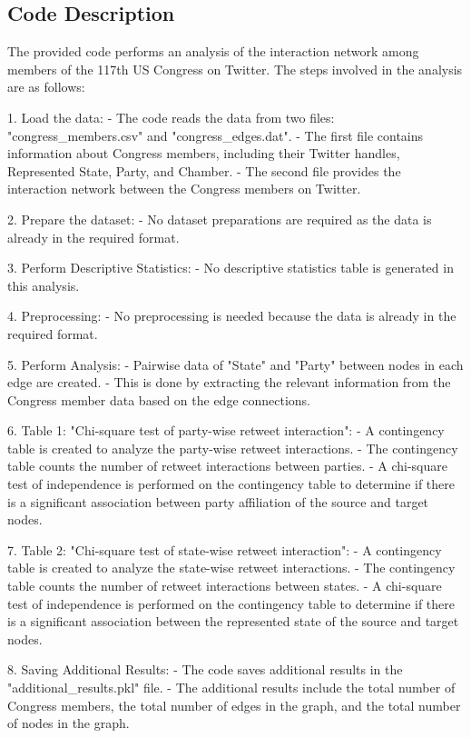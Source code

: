 \documentclass[11pt]{article}
\begin{document}
\subsection{Code Description}

The provided code performs an analysis of the interaction network among members of the 117th US Congress on Twitter. The steps involved in the analysis are as follows:

1. Load the data:
   - The code reads the data from two files: "congress\_members.csv" and "congress\_edges.dat".
   - The first file contains information about Congress members, including their Twitter handles, Represented State, Party, and Chamber.
   - The second file provides the interaction network between the Congress members on Twitter.

2. Prepare the dataset:
   - No dataset preparations are required as the data is already in the required format.

3. Perform Descriptive Statistics:
   - No descriptive statistics table is generated in this analysis.

4. Preprocessing:
   - No preprocessing is needed because the data is already in the required format.

5. Perform Analysis:
   - Pairwise data of "State" and "Party" between nodes in each edge are created.
   - This is done by extracting the relevant information from the Congress member data based on the edge connections.

6. Table 1: "Chi-square test of party-wise retweet interaction":
   - A contingency table is created to analyze the party-wise retweet interactions.
   - The contingency table counts the number of retweet interactions between parties.
   - A chi-square test of independence is performed on the contingency table to determine if there is a significant association between party affiliation of the source and target nodes.

7. Table 2: "Chi-square test of state-wise retweet interaction":
   - A contingency table is created to analyze the state-wise retweet interactions.
   - The contingency table counts the number of retweet interactions between states.
   - A chi-square test of independence is performed on the contingency table to determine if there is a significant association between the represented state of the source and target nodes.

8. Saving Additional Results:
   - The code saves additional results in the "additional\_results.pkl" file.
   - The additional results include the total number of Congress members, the total number of edges in the graph, and the total number of nodes in the graph.
\end{document}
